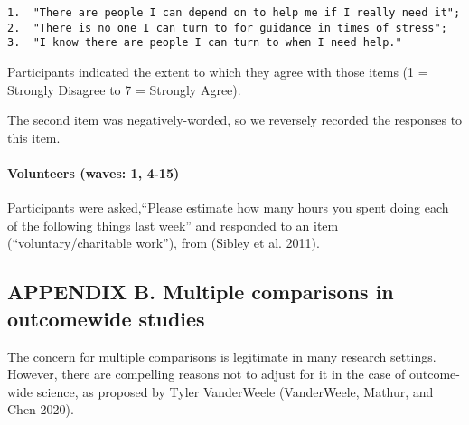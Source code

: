\documentclass[
  letterpaper,
  DIV=11,
  numbers=noendperiod]{scrartcl}
\let\oldparagraph\paragraph
\renewcommand{\paragraph}[1]{\oldparagraph{#1}\mbox{}}
\begin{document}
\begin{verbatim}
1.  "There are people I can depend on to help me if I really need it";
2.  "There is no one I can turn to for guidance in times of stress";
3.  "I know there are people I can turn to when I need help." 
\end{verbatim}

Participants indicated the extent to which they agree with those items
(1 = Strongly Disagree to 7 = Strongly Agree).

The second item was negatively-worded, so we reversely recorded the
responses to this item.

\hypertarget{volunteers-waves-1-4-15}{%
\paragraph{Volunteers (waves: 1, 4-15)}\label{volunteers-waves-1-4-15}}

Participants were asked,``Please estimate how many hours you spent doing
each of the following things last week'' and responded to an item
(``voluntary/charitable work''), from (Sibley et al. 2011).

\newpage{}

\hypertarget{appendix-b.-multiple-comparisons-in-outcomewide-studies}{%
\subsection{APPENDIX B. Multiple comparisons in outcomewide
studies}\label{appendix-b.-multiple-comparisons-in-outcomewide-studies}}

The concern for multiple comparisons is legitimate in many research
settings. However, there are compelling reasons not to adjust for it in
the case of outcome-wide science, as proposed by Tyler VanderWeele
(VanderWeele, Mathur, and Chen 2020).
\end{document}
